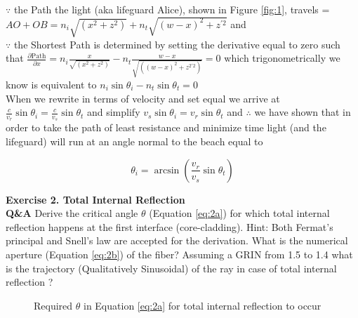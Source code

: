\documentclass[main.tex]{subfiles}
\begin{document}
$\because$ the Path the light  (aka lifeguard Alice), shown in Figure \ref{fig:1},  travels  = $AO + OB = n_i \sqrt{(x^2 + z^2)} + n_t \sqrt{(w-x)^2 +  z^{\prime 2}}$ and\\

$\because$ the Shortest Path is determined by setting the derivative equal to zero such that $ \frac{\partial \text{Path}}{\partial x} = n_i \frac{x}{\sqrt{(x^2 + z^2)}} - n_t \frac{w-x}{\sqrt{((w-x)^2 + z^{2\prime 2})}} = 0$ which trigonometrically we know is equivalent to $n_i \sin{\theta_i} - n_t \sin{\theta_t} = 0$\\

When we rewrite in terms of velocity and set equal we arrive at $\frac{c}{v_r}\sin{\theta_i} = \frac{c}{v_s} \sin{\theta_t}$ and simplify $v_s\sin{\theta_i} = {v_r}\sin{\theta_t}$ and $\therefore$ we have shown that in order to take the path of least resistance and minimize time light (and the lifeguard) will run at an angle normal to the beach equal to 

\begin{equation}\label{sol1a}
\theta_i = \arcsin{(\frac{v_r}{v_s} \sin{\theta_t})}
\end{equation}

\textbf{Exercise 2. Total Internal Reflection}\\
\textbf{Q\&A} Derive the critical angle $\theta$ (Equation \ref{eq:2a}) for which total internal reflection happens at the first interface (core-cladding). Hint: Both Fermat's principal and Snell's law are accepted for the derivation. What is the numerical aperture (Equation \ref{eq:2b}) of the fiber? Assuming a GRIN from 1.5 to 1.4 what is the trajectory (Qualitatively Sinusoidal) of the ray in case of total internal reflection ? \\

\begin{figure}
\centering{}
\caption{Required $\theta$ in Equation \ref{eq:2a} for total internal reflection to occur}
\label{fig:2}
\end{figure}
\end{document}
